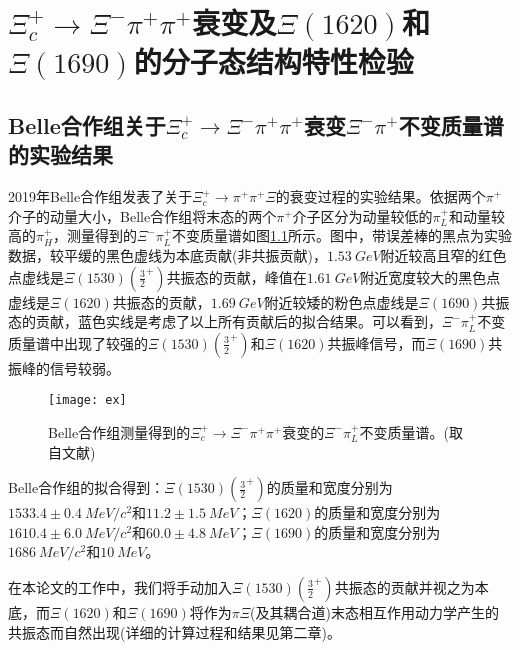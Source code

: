 \chapter[$\Xi^{+}_{c}\to\Xi^{-}\pi^{+}\pi^{+}$衰变及\\$\Xi(1620)$和$\Xi(1690)$的分子态结构特性检验]{$\Xi^{+}_{c}\to\Xi^{-}\pi^{+}\pi^{+}$衰变及$\Xi(1620)$和$\Xi(1690)$的分子态结构特性检验}
\label{chap3}
\section{Belle合作组关于$\Xi_{c}^{+}\to\Xi^{-}\pi^{+}\pi^{+}$衰变$\Xi^{-}\pi^{+}$不变质量谱的实验结果}
2019年Belle合作组发表了关于$\Xi_{c}^{+}\to\pi^{+}\pi^{+}\Xi$的衰变过程的实验结果\cite{PhysRevLett.122.072501}。依据两个$\pi^{+}$介子的动量大小，Belle合作组将末态的两个$\pi^{+}$介子区分为动量较低的$\pi_{L}^{+}$和动量较高的$\pi^{+}_{H}$，测量得到的$\Xi^{-}\pi^{+}_{L}$不变质量谱如图\ref{ex}所示。图中，带误差棒的黑点为实验数据，较平缓的黑色虚线为本底贡献(非共振贡献)，$\SI{1.53}{GeV}$附近较高且窄的红色点虚线是$\Xi(1530)(\frac{3}{2}^{+})$共振态的贡献，峰值在$\SI{1.61}{GeV}$附近宽度较大的黑色点虚线是$\Xi(1620)$共振态的贡献，$\SI{1.69}{GeV}$附近较矮的粉色点虚线是$\Xi(1690)$共振态的贡献，蓝色实线是考虑了以上所有贡献后的拟合结果。可以看到，$\Xi^{-}\pi^{+}_{L}$不变质量谱中出现了较强的$\Xi(1530)(\frac{3}{2}^{+})$和$\Xi(1620)$共振峰信号，而$\Xi(1690)$共振峰的信号较弱。\par
\begin{figure}[h]
	\centering
	\texttt{[image: ex]}
	\caption[实验上$\Xi^{-}\pi^{+}_{L}$不变质量谱]{Belle合作组测量得到的$\Xi_{c}^{+}\to\Xi^{-}\pi^{+}\pi^{+}$衰变的$\Xi^{-}\pi^{+}_{L}$不变质量谱。(取自文献\cite{PhysRevLett.122.072501})}
	\label{ex}
\end{figure}\newpage
Belle合作组的拟合得到：$\Xi(1530)(\frac{3}{2}^{+})$的质量和宽度分别为$1533.4\pm\SI{0.4}{MeV}/c^2$和$11.2\pm\SI{1.5}{MeV}$；$\Xi(1620)$的质量和宽度分别为$1610.4\pm\SI{6.0}{MeV}/c^2$和$60.0\pm\SI{4.8}{MeV}$；$\Xi(1690)$的质量和宽度分别为$\SI{1686}{MeV}/c^2$和$\SI{10}{MeV}$。
\par
在本论文的工作中，我们将手动加入$\Xi(1530)(\frac{3}{2}^{+})$共振态的贡献并视之为本底，而$\Xi(1620)$和$\Xi(1690)$将作为$\pi\Xi$(及其耦合道)末态相互作用动力学产生的共振态而自然出现(详细的计算过程和结果见第二章)。
